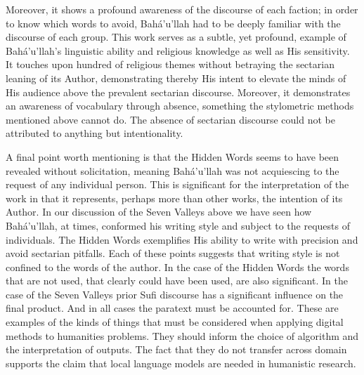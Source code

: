 \documentclass[12pt, oneside]{report}
\begin{document}
Moreover, it shows a profound awareness of the discourse of each faction; in order to know which words to avoid, Bah\'{a}'u'llah had to be deeply familiar with the discourse of each group.
This work serves as a subtle, yet profound, example of Bah\'{a}'u'llah's linguistic ability and religious knowledge as well as His sensitivity.
It touches upon hundred of religious themes without betraying the sectarian leaning of its Author, demonstrating thereby His intent to elevate the minds of His audience above the prevalent sectarian discourse.
Moreover, it demonstrates an awareness of vocabulary through absence, something the stylometric methods mentioned above cannot do.
The absence of sectarian discourse could not be attributed to anything but intentionality.
\par
A final point worth mentioning is that the Hidden Words seems to have been revealed without solicitation, meaning Bah\'{a}'u'llah was not acquiescing to the request of any individual person.
This is significant for the interpretation of the work in that it represents, perhaps more than other works, the intention of its Author.
In our discussion of the Seven Valleys above we have seen how Bah\'{a}'u'llah, at times, conformed his writing style and subject to the requests of individuals.
The Hidden Words exemplifies His ability to write with precision and avoid sectarian pitfalls.
Each of these points suggests that writing style is not confined to the words of the author.
In the case of the Hidden Words the words that are not used, that clearly could have been used, are also significant.
In the case of the Seven Valleys prior Sufi discourse has a significant influence on the final product.
And in all cases the paratext must be accounted for.
These are examples of the kinds of things that must be considered when applying digital methods to humanities problems.
They should inform the choice of algorithm and the interpretation of outputs.
The fact that they do not transfer across domain supports the claim that local language models are needed in humanistic research.
\end{document}

